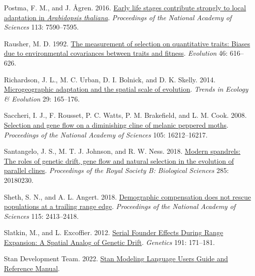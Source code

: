 \documentclass[
  12pt,
]{article}
\newlength{\cslhangindent}
\newlength{\cslentryspacingunit} %
\newenvironment{CSLReferences}[2] %
 {%
  \setlength{\parindent}{0pt}
  \ifodd #1
  \let\oldpar\par
  \def\par{\hangindent=\cslhangindent\oldpar}
  \fi
  \setlength{\parskip}{#2\cslentryspacingunit}
 }%
 {}
\begin{document}
\begin{CSLReferences}{1}{0}
\leavevmode{}%
Postma, F. M., and J. Ågren. 2016. \href{https://doi.org/10.1073/pnas.1606303113}{Early life stages contribute strongly to local adaptation in \emph{{Arabidopsis} thaliana}}. \emph{Proceedings of the National Academy of Sciences} 113: 7590--7595.

\leavevmode{}%
Rausher, M. D. 1992. \href{https://doi.org/10.1111/j.1558-5646.1992.tb02070.x}{The measurement of selection on quantitative traits: Biases due to environmental covariances between traits and fitness}. \emph{Evolution} 46: 616--626.

\leavevmode{}%
Richardson, J. L., M. C. Urban, D. I. Bolnick, and D. K. Skelly. 2014. \href{https://doi.org/10.1016/j.tree.2014.01.002}{Microgeographic adaptation and the spatial scale of evolution}. \emph{Trends in Ecology \& Evolution} 29: 165--176.

\leavevmode{}%
Saccheri, I. J., F. Rousset, P. C. Watts, P. M. Brakefield, and L. M. Cook. 2008. \href{https://doi.org/10.1073/pnas.0803785105}{Selection and gene flow on a diminishing cline of melanic peppered moths}. \emph{Proceedings of the National Academy of Sciences} 105: 16212--16217.

\leavevmode{}%
Santangelo, J. S., M. T. J. Johnson, and R. W. Ness. 2018. \href{https://doi.org/10.1098/rspb.2018.0230}{Modern spandrels: The roles of genetic drift, gene flow and natural selection in the evolution of parallel clines}. \emph{Proceedings of the Royal Society B: Biological Sciences} 285: 20180230.

\leavevmode{}%
Sheth, S. N., and A. L. Angert. 2018. \href{https://doi.org/10.1073/pnas.1715899115}{Demographic compensation does not rescue populations at a trailing range edge}. \emph{Proceedings of the National Academy of Sciences} 115: 2413--2418.

\leavevmode{}%
Slatkin, M., and L. Excoffier. 2012. \href{https://doi.org/10.1534/genetics.112.139022}{Serial {Founder} {Effects} {During} {Range} {Expansion}: {A} {Spatial} {Analog} of {Genetic} {Drift}}. \emph{Genetics} 191: 171--181.

\leavevmode{}%
Stan Development Team. 2022. \href{https://mc-stan.org}{Stan {Modeling} {Language} {Users} {Guide} and {Reference} {Manual}}.


\end{CSLReferences}
\end{document}
